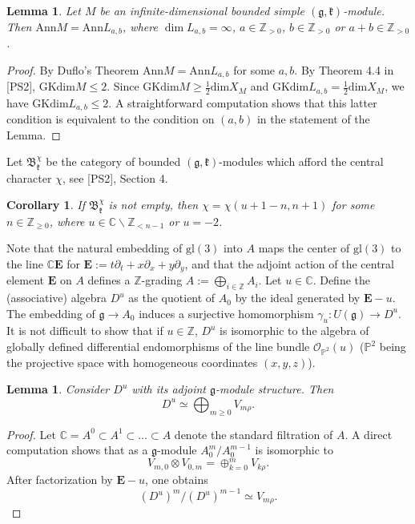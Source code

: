 \documentclass[12pt]{amsart}
\theoremstyle{plain} %
\newtheorem{lemma}[definition]{Lemma}
\newtheorem{corollary}[definition]{Corollary}
\newcommand{\Ann}{\mathrm{Ann}}
\newcommand{\gl}{\mathrm{gl}}
\newcommand {\ZZ} {\mathbb {Z}}
\newcommand {\CC} {\mathbb {C}}
\newcommand {\EE} {\mathbf {E}}
\newcommand {\PP} {\mathbb {P}}
\newcommand{\kk}{\mathfrak{k}}
\renewcommand{\gg}{\mathfrak{g}}
\newcommand {\BB} {\mathfrak {B}}
\newcommand {\OO} {\mathscr {O}}
\begin{document}
\begin{lemma}\label{le100sl}
Let $M$ be an infinite-dimensional bounded simple $(\gg,\kk)$-module.
Then $\Ann M=\Ann L_{a,b}$, where $\dim L_{a,b}=\infty$, $a\in\ZZ_{>0}$, $b\in \ZZ_{>0}$ or $a+b\in\ZZ_{>0}$.
\end{lemma}
\begin{proof}
By Duflo's Theorem $\Ann M=\Ann L_{a,b}$ for some $a,b$. By Theorem
4.4 in [PS2],  
$\mathrm{GKdim}M\leq 2$. Since
$\mathrm{GKdim}M\geq\frac{1}{2}\mathrm{dim}X_M$ and
$\mathrm{GKdim}L_{a,b}=\frac{1}{2}\mathrm{dim}X_M$, we have
$\mathrm{GKdim}L_{a,b}\leq 2$. A straightforward computation shows that this latter
condition is equivalent to the condition on $(a,b)$ in the statement
of the Lemma.
\end{proof}

Let $\BB_\kk^{\chi}$ be the category of bounded $(\gg,\kk)$-modules which afford the central character $\chi$, see [PS2], Section 4.

\begin{corollary}\label{corPrimIdeal}
If $\BB^\chi_\kk$ is not empty, then $\chi=\chi(u+1-n,n+1)$ for some $n\in\ZZ_{\geq 0}$, where $u\in\CC\backslash \ZZ_{<n-1}$ or $u=-2$.
\end{corollary}

Note that the natural embedding of $\gl(3)$ into $A$ maps the center of
$\gl(3)$ to the line $\CC \EE$ for
$\EE:=t\partial_t+x\partial_x+y\partial_y$, and that the adjoint
action of the central element $\EE$ on $A$ defines a $\ZZ$-grading
$A:=\bigoplus _{i\in \ZZ}A_i$. Let $u\in\mathbb C$. Define the (associative) algebra $D^u$ as the
quotient of $A_0$ by the ideal generated by $\EE-u$. The embedding of
$\gg\to A_0$ induces a surjective homomorphism $\gamma_u: U(\gg)\to
D^u$. It is not difficult to show that if $u\in\ZZ$, $D^u$ is
isomorphic to the algebra of globally defined differential
endomorphisms of the line bundle $\OO_{\PP^2}(u)$ ($\PP^2$ being the
projective space with homogeneous coordinates $(x,y,z)$).

\begin{lemma}\label{le1021sl} Consider $D^u$ with its adjoint $\gg$-module structure. Then
\[
D^u\simeq \bigoplus_{m\geq 0}V_{m\rho}.
\]
\end{lemma}
\begin{proof} Let $\CC =A^0\subset A^1 \subset \dots \subset A$
  denote the standard filtration of $A$. A direct computation shows
  that as a $\gg$-module $A_0^m/A_0^{m-1}$ is
  isomorphic to
\[
V_{m,0}\otimes V_{0,m}=\oplus_{k=0}^m V_{k \rho}. 
\]
 After factorization by $\EE-u$, one obtains
\[
(D^u)^m/(D^u)^{m-1}\simeq V_{m \rho}. 
\]
\end{proof}
\end{document}
